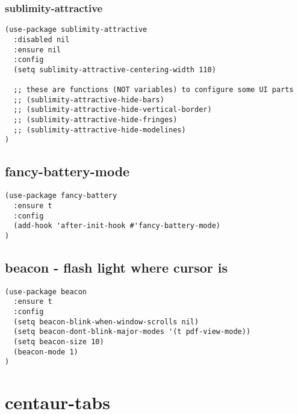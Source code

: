 \documentclass[11pt]{article}
\begin{document}
\subsubsection*{sublimity-attractive}
\label{sec:org3a623a2}
\begin{verbatim}
(use-package sublimity-attractive
  :disabled nil
  :ensure nil
  :config
  (setq sublimity-attractive-centering-width 110)

  ;; these are functions (NOT variables) to configure some UI parts
  ;; (sublimity-attractive-hide-bars)
  ;; (sublimity-attractive-hide-vertical-border)
  ;; (sublimity-attractive-hide-fringes)
  ;; (sublimity-attractive-hide-modelines)
)

\end{verbatim}

\subsection*{fancy-battery-mode}
\label{sec:org428734d}
\begin{verbatim}
(use-package fancy-battery
  :ensure t
  :config
  (add-hook 'after-init-hook #'fancy-battery-mode)
)
\end{verbatim}
\subsection*{beacon - flash light where cursor is}
\label{sec:org50ebe67}
\begin{verbatim}
(use-package beacon
  :ensure t
  :config
  (setq beacon-blink-when-window-scrolls nil)
  (setq beacon-dont-blink-major-modes '(t pdf-view-mode))
  (setq beacon-size 10)
  (beacon-mode 1)
)
\end{verbatim}




\section*{centaur-tabs}
\label{sec:org74f5fcd}
\end{document}
